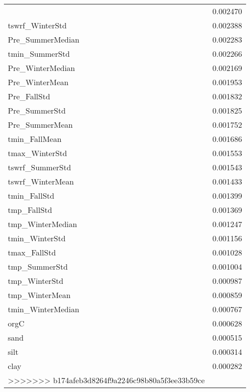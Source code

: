 \begin{tabular}{lr}
\begin{tabular}{rrrrr}
tmax_SummerStd & 0.002470 \\
tswrf_WinterStd & 0.002388 \\
Pre_SummerMedian & 0.002283 \\
tmin_SummerStd & 0.002266 \\
Pre_WinterMedian & 0.002169 \\
Pre_WinterMean & 0.001953 \\
Pre_FallStd & 0.001832 \\
Pre_SummerStd & 0.001825 \\
Pre_SummerMean & 0.001752 \\
tmin_FallMean & 0.001686 \\
tmax_WinterStd & 0.001553 \\
tswrf_SummerStd & 0.001543 \\
tswrf_WinterMean & 0.001433 \\
tmin_FallStd & 0.001399 \\
tmp_FallStd & 0.001369 \\
tmp_WinterMedian & 0.001247 \\
tmin_WinterStd & 0.001156 \\
tmax_FallStd & 0.001028 \\
tmp_SummerStd & 0.001004 \\
tmp_WinterStd & 0.000987 \\
tmp_WinterMean & 0.000859 \\
tmin_WinterMedian & 0.000767 \\
orgC & 0.000628 \\
sand & 0.000515 \\
silt & 0.000314 \\
clay & 0.000282 \\
>>>>>>> b174afeb3d8264f9a2246c98b80a5f3ee33b59ce
\bottomrule
\end{tabular}

